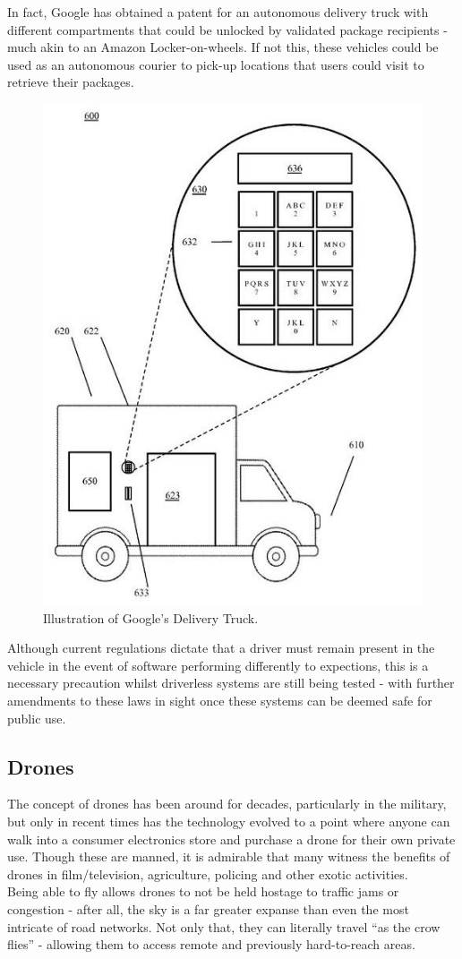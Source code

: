 \documentclass[a4paper,11pt,titlepage]{report}
\begin{document}
In fact, Google has obtained a patent for an autonomous delivery truck \cite{Hall-Geisler} with different compartments that could be unlocked by validated package recipients - much akin to an Amazon Locker-on-wheels. If not this, these vehicles could be used as an autonomous courier to pick-up locations that users could visit to retrieve their packages.

\begin{figure}[!hbpt]
  \center
  \includegraphics[width=0.4\linewidth]{img/google_truck_patent.jpeg}
  \caption{Illustration of Google's Delivery Truck. \cite{google_truck_patent}}
  \label{fig:google_truck_patent}
\end{figure}

Although current regulations dictate that a driver must remain present in the vehicle in the event of software performing differently to expections, this is a necessary precaution whilst driverless systems are still being tested - with further amendments to these laws in sight once these systems can be deemed safe for public use. \cite{Bowcott2017}

\newpage
\subsection{Drones}
The concept of drones has been around for decades, particularly in the military, but only in recent times has the technology evolved to a point where anyone can walk into a consumer electronics store and purchase a drone for their own private use. Though these are manned, it is admirable that many witness the benefits of drones in film/television\cite{Verrier2015}, agriculture\cite{Jarman2016}, policing\cite{BBCNews2017a} and other exotic activities\cite{Roberts2016}. \\

Being able to fly allows drones to not be held hostage to traffic jams or congestion - after all, the sky is a far greater expanse than even the most intricate of road networks. Not only that, they can literally travel ``as the crow flies'' - allowing them to access remote and previously hard-to-reach areas.\\
\end{document}
